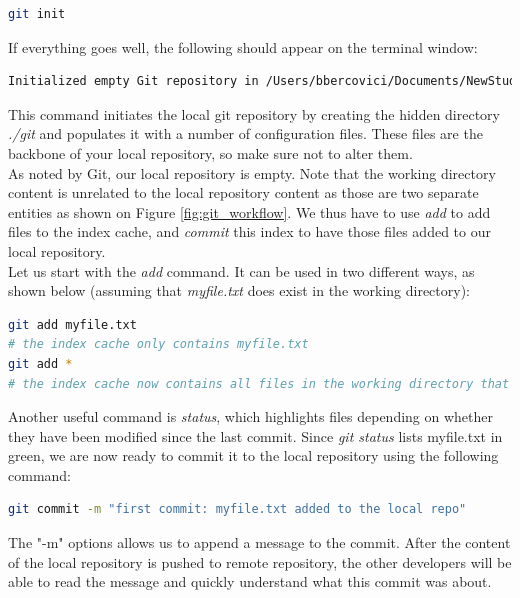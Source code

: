 \begin{lstlisting}[language=bash, caption=Creation of the local repository]
git init
\end{lstlisting}

If everything goes well, the following should appear on the terminal window:

\begin{lstlisting}[language=bash, caption=Successful git init message ]
Initialized empty Git repository in /Users/bbercovici/Documents/NewStudentHandout/.git/
\end{lstlisting}

This command initiates the local git repository by creating the hidden directory \textit{./git} and populates it with a number of configuration files. These files are the backbone of your local repository, so make sure not to alter them.\\
As noted by Git, our local repository is empty. Note that the working directory content is unrelated to the local repository content as those are two separate entities as shown on Figure \ref{fig:git_workflow}. We thus have to use \textit{add} to add files to the index cache, and \textit{commit} this index to have those files added to our local repository.\\

Let us start with the \textit{add} command. It can be used in two different ways, as shown below (assuming that \textit{myfile.txt} does exist in the working directory):

\begin{lstlisting}[language=bash, caption=Add files to the cache ]
git add myfile.txt
# the index cache only contains myfile.txt
git add *
# the index cache now contains all files in the working directory that were not excluded in .gitignore 
\end{lstlisting}
Another useful command is \textit{status}, which highlights files depending on whether they have been modified since the last commit. Since \textit{git status} lists myfile.txt in green, we are now ready to commit it to the local repository using the following command:
\begin{lstlisting}[language=bash, caption=commit files to the local repository ]
git commit -m "first commit: myfile.txt added to the local repo"
\end{lstlisting}
The "-m" options allows us to append a message to the commit. After the content of the local repository is pushed to remote repository, the other developers will be able to read the message and quickly understand what this commit was about.


